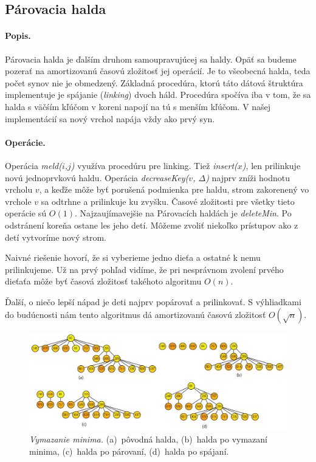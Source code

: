 \subsection{Párovacia halda} 
\paragraph{Popis.}
Párovacia halda je ďalším druhom samoupravujúcej sa haldy. Opäť sa budeme pozerať na amortizovanú časovú zložitosť jej operácií.
Je to všeobecná halda, teda počet synov nie je obmedzený.
Základná procedúra, ktorú táto dátová štruktúra implementuje je spájanie (\emph{linking}) dvoch háld. Procedúra spočíva iba v tom, že sa halda s väčśím kľúčom v koreni napojí na tú s menším kľúčom. V našej implementácií sa nový vrchol napája vždy ako prvý syn.

\paragraph{Operácie.}
Operácia \emph{meld($i$,$j$)} využíva procedúru pre linking. Tiež \emph{insert($x$)}, len prilinkuje novú jednoprvkovú haldu. Operácia \emph{decreaseKey($v$, $\Delta$)} najprv zníži hodnotu vrcholu $v$, a keďže môže byť porušená podmienka pre haldu, strom zakorenený vo vrchole $v$ sa odtrhne a prilinkuje ku zvyšku. Časové zložitosti pre všetky tieto operácie sú $O(1)$.
Najzaujímavejšie na Párovacích haldách je \emph{deleteMin}. Po odstránení koreňa ostane les jeho detí. Môžeme zvoliť niekoľko prístupov ako z detí vytvoríme nový strom.

Naivné riešenie hovorí, že si vyberieme jedno dieťa a ostatné k nemu prilinkujeme. Už na prvý pohľad vidíme, že pri nesprávnom 
zvolení prvého dieťaťa môže byť časová zložitosť takéhoto algoritmu $O(n)$.

Ďalší, o niečo lepší nápad je deti najprv popárovať a prilinkovať. S výhliadkami do budúcnosti nám tento algoritmus dá 
amortizovanú časovú zložitosť $O(\sqrt{n})$.

\begin{figure}
\includegraphics[width=\columnwidth]{obrazky/pairdel.png}
\caption{\emph{Vymazanie minima.} 
(a)~pôvodná halda, (b)~halda po vymazaní minima, (c)~halda po párovaní, (d)~halda po spájaní.} 
\label{img:pairdel} 
\end{figure}

